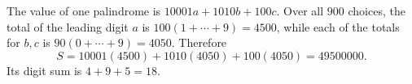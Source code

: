 The value of one palindrome is $10001a+1010b+100c$. Over all $900$ choices, the total of the leading digit $a$ is $100(1+\cdots+9)=4500$, while each of the totals for $b,c$ is $90(0+\cdots+9)=4050$. Therefore
\[
S=10001(4500)+1010(4050)+100(4050)=49500000.
\]
Its digit sum is $\boxed{4+9+5=18}$.
